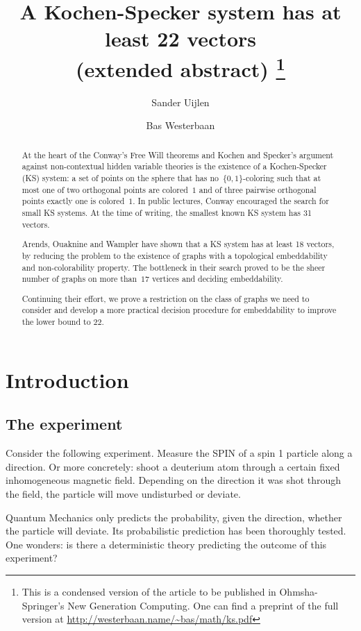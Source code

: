 \documentclass[adraft,copyright,creativecommons]{eptcs}
\title{A Kochen-Specker system has at least 22 vectors\\
        {\small (extended abstract)%
            \footnote{This is a condensed version of the article
                        to be published in Ohmsha-Springer's
                        New Generation Computing.
                    One can find a preprint of the full version at
                    \url{http://westerbaan.name/\~bas/math/ks.pdf}}}}
\author{Sander Uijlen
    \institute{Radboud Universiteit}
    \email{suijlen@cs.ru.nl}
\and
    Bas Westerbaan
    \institute{Radboud Universiteit}
    \email{bwesterb@cs.ru.nl}}
\theoremstyle{definition}
\theoremstyle{remark}
\begin{document}
\maketitle

\begin{abstract}
    At the heart of the Conway's Free Will theorems and Kochen and Specker's
        argument against non-contextual hidden variable theories
    is the existence of a Kochen-Specker (KS) system:
    a set of points on the sphere
    that has no~$\{0,1\}$-coloring such that
    at most one of two orthogonal points are colored~$1$
    and of three pairwise orthogonal points exactly one
    is colored~$1$.
    In public lectures, Conway encouraged the search for small
    KS systems.
    At the time of writing, the smallest known
    KS system has 31 vectors.  

    Arends, Ouaknine and Wampler have shown that a KS system has at least
    18 vectors, by reducing the problem to the existence of graphs
    with a topological embeddability and non-colorability property.
    The bottleneck in their search
    proved to be the sheer number of graphs on more than~$17$
    vertices and deciding embeddability.

    Continuing their effort, we prove a restriction on the class of graphs
    we need to consider and develop a more practical decision procedure for
    embeddability to improve the lower bound to 22.
\end{abstract}

\clearpage
    
\section{Introduction}

\subsection{The experiment}

Consider the following experiment. Measure the SPIN of a spin 1
particle along a direction. Or more concretely: shoot a deuterium
atom through a certain fixed inhomogeneous magnetic field. Depending
on the direction it was shot through the field, the particle will
move undisturbed or deviate.

Quantum Mechanics only predicts the probability, given the direction,
whether the particle will deviate.
Its probabilistic prediction has been thoroughly tested.
One wonders: is there a deterministic theory predicting the
outcome of this experiment?
\end{document}
